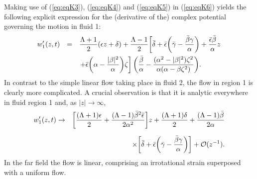 \documentclass[fleqn]{jleo}
\begin{document}
Making use of (\ref{eq:eqK3}), (\ref{eq:eqK4}) and (\ref{eq:eqK5})
in (\ref{eq:eqK6}) yields the following explicit expression for the (derivative
of the) complex potential governing the motion in fluid 1:
\begin{equation}
\begin{array}{rcl}
\displaystyle w_1'(z,t) & \displaystyle=&\displaystyle {\Lambda+1 \over 2} (\epsilon z + \delta)+{\Lambda-1 \over 2} {\left[\vphantom{+\bar \epsilon {\left(\alpha -{|\beta|^2 \over \alpha} \right )} \zeta}\bar \delta +
\bar \epsilon {\left(\bar \gamma - {\bar \beta \gamma \over \alpha} \right)}+ {\bar \epsilon \bar \beta \over \alpha} z\right.}\nonumber\\[10pt] 
&&\displaystyle\left.+\bar \epsilon {\left( \alpha -{|\beta|^2 \over \alpha} \right )} \zeta\right]{\left({\bar \beta \over \alpha} -{(\alpha^2 -|\beta|^2) \zeta^2 \over\alpha( \alpha - \beta \zeta^2)} \right )}. \label{eq:eqW1}
\end{array}\end{equation}
In contrast to the simple linear flow taking place in fluid 2,
the flow in region 1 is clearly more complicated.
A crucial observation is that it is analytic
everywhere in fluid region 1 and, as $|z| \to \infty$,
\begin{eqnarray}
w_1'(z,t) &\to& {\left[ {(\Lambda + 1) \epsilon \over 2} + 
{(\Lambda - 1) \bar \beta^2 \bar \epsilon \over 2 \alpha^2} \right ]} z
+ {(\Lambda +1) \delta \over 2}+
{(\Lambda -1) \bar \beta \over 2 \alpha}\nonumber\\[6pt]
&&\quad\times{\left[\bar \delta + {\bar \epsilon}
{\left( \bar \gamma - {\bar \beta \gamma
\over \alpha} \right)} \right]}
+ {\cal O}(z^{-1}).\label{eq:eqFF}
\end{eqnarray}
In the far field the flow is linear, comprising an irrotational strain superposed with a uniform flow.
\end{document}
